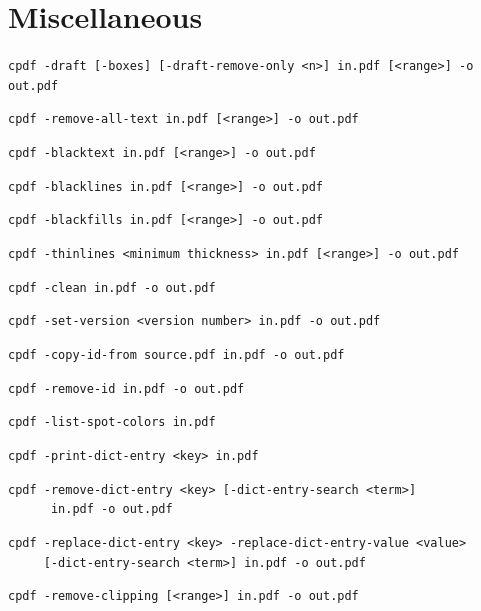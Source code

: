 \documentclass{book}
\begin{document}
\chapter{Miscellaneous}\label{chap:misc}\pagestyle{fancy}
  {\small\begin{framed}
  \noindent\verb!cpdf -draft [-boxes] [-draft-remove-only <n>] in.pdf [<range>] -o out.pdf!

  \vspace{1.5mm}
  \noindent\verb!cpdf -remove-all-text in.pdf [<range>] -o out.pdf!

  \vspace{1.5mm}
  \noindent\verb!cpdf -blacktext in.pdf [<range>] -o out.pdf!

  \vspace{1.5mm}
  \noindent\verb!cpdf -blacklines in.pdf [<range>] -o out.pdf!

  \vspace{1.5mm}
  \noindent\verb!cpdf -blackfills in.pdf [<range>] -o out.pdf!

  \vspace{1.5mm}
  \noindent\verb!cpdf -thinlines <minimum thickness> in.pdf [<range>] -o out.pdf!

  \vspace{1.5mm}
  \noindent\verb!cpdf -clean in.pdf -o out.pdf!

  \vspace{1.5mm}
  \noindent\verb!cpdf -set-version <version number> in.pdf -o out.pdf!

  \vspace{1.5mm}
  \noindent\verb!cpdf -copy-id-from source.pdf in.pdf -o out.pdf!

  \vspace{1.5mm}
  \noindent\verb!cpdf -remove-id in.pdf -o out.pdf!

  \vspace{1.5mm}
  \noindent\verb!cpdf -list-spot-colors in.pdf!

  \vspace{1.5mm}
  \noindent\verb!cpdf -print-dict-entry <key> in.pdf!

  \vspace{1.5mm}
  \noindent\verb!cpdf -remove-dict-entry <key> [-dict-entry-search <term>]!\\
  \noindent\verb!      in.pdf -o out.pdf!

  \vspace{1.5mm}
  \noindent\verb!cpdf -replace-dict-entry <key> -replace-dict-entry-value <value>!\\
  \noindent\verb!     [-dict-entry-search <term>] in.pdf -o out.pdf!

  \vspace{1.5mm}
  \noindent\verb!cpdf -remove-clipping [<range>] in.pdf -o out.pdf!
  \end{framed}}
\end{document}
